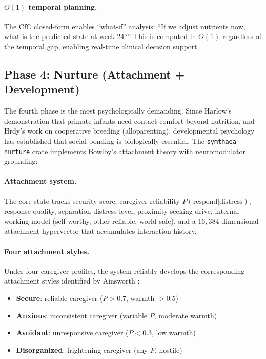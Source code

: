 \documentclass[11pt,letterpaper]{article}
\newcommand{\dimHDC}{16{,}384}
\begin{document}
\paragraph{$O(1)$ temporal planning.} The CfC closed-form enables
``what-if'' analysis: ``If we adjust nutrients now, what is the predicted state
at week 24?'' This is computed in $O(1)$ regardless of the temporal gap,
enabling real-time clinical decision support.

\subsection{Phase 4: Nurture (Attachment + Development)}

The fourth phase is the most psychologically demanding. Since
Harlow's \cite{harlow1958nature} demonstration that primate infants need contact
comfort beyond nutrition, and Hrdy's \cite{hrdy2011mothers} work on cooperative
breeding (alloparenting), developmental psychology has established that
social bonding is biologically essential. The \texttt{symthaea-nurture} crate
implements Bowlby's attachment theory \cite{bowlby1969attachment} with
neuromodulator grounding:

\paragraph{Attachment system.} The core state tracks security score, caregiver
reliability $P(\text{respond} | \text{distress})$, response quality, separation
distress level, proximity-seeking drive, internal working model (self-worthy,
other-reliable, world-safe), and a $\dimHDC$-dimensional attachment hypervector
that accumulates interaction history.

\paragraph{Four attachment styles.} Under four caregiver profiles, the system
reliably develops the corresponding attachment styles identified by Ainsworth
\cite{ainsworth1978patterns}:
\begin{itemize}[nosep,leftmargin=2em]
\item \textbf{Secure}: reliable caregiver ($P > 0.7$, warmth $> 0.5$)
\item \textbf{Anxious}: inconsistent caregiver (variable $P$, moderate warmth)
\item \textbf{Avoidant}: unresponsive caregiver ($P < 0.3$, low warmth)
\item \textbf{Disorganized}: frightening caregiver (any $P$, hostile)
\end{itemize}
\end{document}
